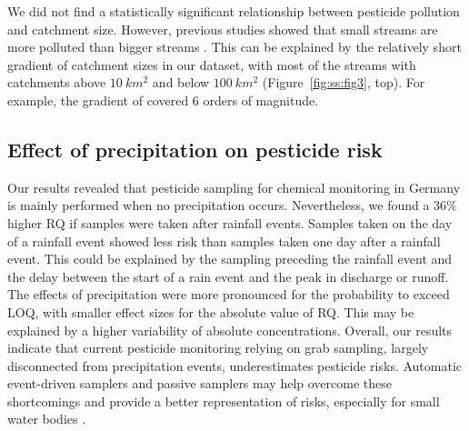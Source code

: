 We did not find a statistically significant relationship between pesticide pollution and catchment size.
However, previous studies showed that small streams are more polluted than bigger streams \citep{schulz_field_2004,stehle_pesticide_2015,knauer_pesticides_2016}.
This can be explained by the relatively short gradient of catchment sizes in our dataset, with most of the streams with catchments above $10~km^2$ and below $100~km^2$ (Figure~\ref{fig:ss:fig3}, top).
For example, the gradient of \citet{schulz_field_2004} covered 6 orders of magnitude.


\subsection{Effect of precipitation on pesticide risk}
Our results revealed that pesticide sampling for chemical monitoring in Germany is mainly performed when no precipitation occurs. 
Nevertheless, we found a 36\% higher RQ if samples were taken after rainfall events. 
Samples taken on the day of a rainfall event showed less risk than samples taken one day after a rainfall event.
This could be explained by the sampling preceding the rainfall event and the delay between the start of a rain event and the peak in discharge or runoff. 
The effects of precipitation were more pronounced for the probability to exceed LOQ, with smaller effect sizes for the absolute value of RQ. 
This may be explained by a higher variability of absolute concentrations.
Overall, our results indicate that current pesticide monitoring relying on grab sampling, largely disconnected from precipitation events, underestimates pesticide risks.
Automatic event-driven samplers \citep{stehle_probabilistic_2013} and passive samplers \citep{fernandez_calibration_2014,moschet_evaluation_2015} may help overcome these shortcomings and provide a better representation of risks, especially for small water bodies \citep{lorenz_specifics_2016}. 

